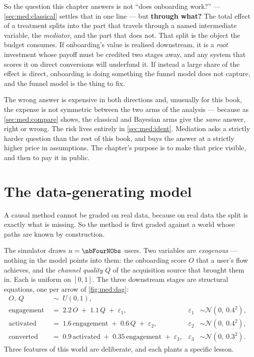 So the question this chapter answers is not ``does onboarding work?'' --- \cref{sec:med:classical}
settles that in one line --- but \textbf{through what?} The total effect of a treatment splits into
the part that travels through a named intermediate variable, the \emph{mediator}, and the part
that does not. That split is the object the budget consumes. If onboarding's value is realised
downstream, it is a \emph{root} investment whose payoff must be credited two stages away, and any
system that scores it on direct conversions will underfund it. If instead a large share of the
effect is direct, onboarding is doing something the funnel model does not capture, and the funnel
model is the thing to fix.

The wrong answer is expensive in both directions and, unusually for this book, the expense is not
symmetric between the two arms of the analysis --- because as \cref{sec:med:compare} shows, the
classical and Bayesian arms give the \emph{same} answer, right or wrong. The risk lives entirely
in \cref{sec:med:ident}. Mediation asks a strictly harder question than the rest of this book, and
buys the answer at a strictly higher price in assumptions. The chapter's purpose is to make that
price visible, and then to pay it in public.

\section{The data-generating model}
\label{sec:med:dgm}

A causal method cannot be graded on real data, because on real data the split is exactly what is
missing. So the method is first graded against a world whose paths are known by construction.

The simulator draws $n = \nbFourNObs$ users. Two variables are \emph{exogenous} --- nothing in the
model points into them: the onboarding score $O$ that a user's flow achieves, and the
\emph{channel quality} $Q$ of the acquisition source that brought them in. Each is uniform on
$[0,1]$. The three downstream stages are structural equations, one per arrow of
\cref{fig:med:dag}:
%
\begin{align}
  O,\ Q &\;\sim\; U(0,1), \label{eq:med:exog}\\
  \text{engagement} &\;=\; 2.2\,O \;+\; 1.1\,Q \;+\; \varepsilon_1,
        &\varepsilon_1 &\sim \mathcal N(0,\ 0.4^{2}), \label{eq:med:eng}\\
  \text{activated} &\;=\; 1.6\,\text{engagement} \;+\; 0.6\,Q \;+\; \varepsilon_2,
        &\varepsilon_2 &\sim \mathcal N(0,\ 0.4^{2}), \label{eq:med:act}\\
  \text{converted} &\;=\; 0.9\,\text{activated} \;+\; 0.35\,\text{engagement} \;+\; \varepsilon_3,
        &\varepsilon_3 &\sim \mathcal N(0,\ 0.3^{2}). \label{eq:med:conv}
\end{align}
%
Three features of this world are deliberate, and each plants a specific lesson.

